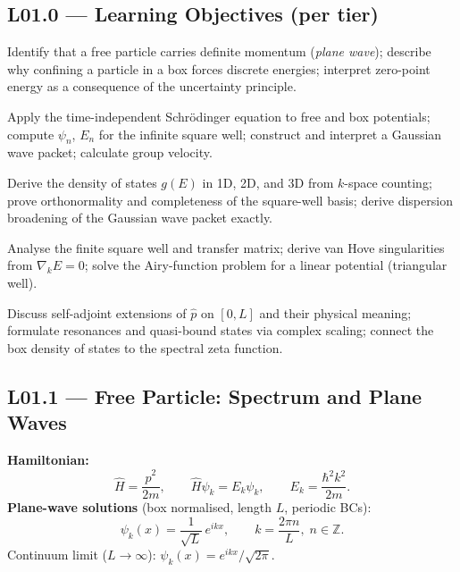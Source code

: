\subsection*{L01.0 — Learning Objectives (per tier)}
\label{sec:L01.0}

\quad
Identify that a free particle carries definite momentum (\emph{plane wave});
describe why confining a particle in a box forces discrete energies;
interpret zero-point energy as a consequence of the uncertainty principle.

\quad
Apply the time-independent Schrödinger equation to free and box potentials;
compute $\psi_n$, $E_n$ for the infinite square well;
construct and interpret a Gaussian wave packet; calculate group velocity.

\quad
Derive the density of states $g(E)$ in 1D, 2D, and 3D from $k$-space counting;
prove orthonormality and completeness of the square-well basis;
derive dispersion broadening of the Gaussian wave packet exactly.

\quad
Analyse the finite square well and transfer matrix;
derive van Hove singularities from $\nabla_k E = 0$;
solve the Airy-function problem for a linear potential (triangular well).

\quad
Discuss self-adjoint extensions of $\hat{p}$ on $[0,L]$ and their physical meaning;
formulate resonances and quasi-bound states via complex scaling;
connect the box density of states to the spectral zeta function.

\subsection*{L01.1 — Free Particle: Spectrum and Plane Waves}
\label{sec:L01.1}

\begin{tcolorbox}[lecturebox, title={L01.1 Main result}]
\textbf{Hamiltonian:}
\begin{equation}
  \hat{H} = \frac{\hat{p}^2}{2m}, \qquad
  \hat{H}\psi_k = E_k\psi_k, \qquad
  E_k = \frac{\hbar^2 k^2}{2m}.
  \label{eq:L01.1}
\end{equation}
\textbf{Plane-wave solutions} (box normalised, length $L$, periodic BCs):
\begin{equation}
  \psi_k(x) = \frac{1}{\sqrt{L}}\,e^{ikx}, \qquad
  k = \frac{2\pi n}{L},\; n\in\mathbb{Z}.
  \label{eq:L01.2}
\end{equation}
Continuum limit ($L\to\infty$): $\psi_k(x) = e^{ikx}/\sqrt{2\pi}$.
\end{tcolorbox}

